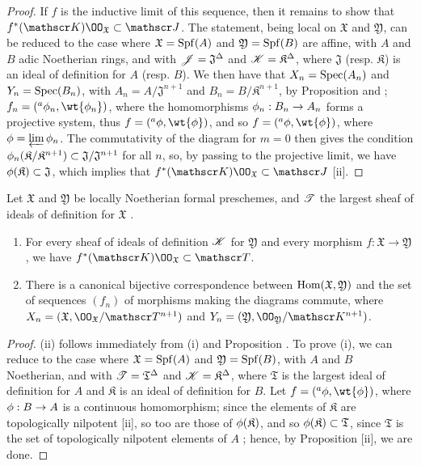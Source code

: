 \begin{proof}
\label{proof-1.10.6.9}
If $f$ is the inductive limit of this sequence, then it remains to show that $f^*(\sh{K})\OO_\mathfrak{X}\subset\sh{J}$.
The statement, being local on $\mathfrak{X}$ and $\mathfrak{Y}$, can be reduced to the case where $\mathfrak{X}=\operatorname{Spf}(A)$ and $\mathfrak{Y}=\operatorname{Spf}(B)$ are affine, with $A$ and $B$ adic Noetherian rings, and with $\mathscr{J}=\mathfrak{J}^\Delta$ and $\mathscr{K}=\mathfrak{K}^\Delta$, where $\mathfrak{J}$ (resp. $\mathfrak{K}$) is an ideal of definition for $A$ (resp. $B$).
We then have that $X_n=\operatorname{Spec}(A_n)$ and $Y_n=\operatorname{Spec}(B_n)$, with $A_n=A/\mathfrak{J}^{n+1}$ and $B_n=B/\mathfrak{K}^{n+1}$, by Proposition  and ; $f_n=({}^a\vphi_n,\wt{\vphi_n})$, where the homomorphisms $\vphi_n:B_n\to A_n$ forms a projective system, thus $f=({}^a\vphi,\wt{\vphi})$, and so $f=({}^a\vphi,\wt{\vphi})$, where $\phi=\varprojlim\phi_n$.
The commutativity of the diagram  for $m=0$ then gives the condition $\phi_n(\mathfrak{K}/\mathfrak{K}^{n+1})\subset\mathfrak{J}/\mathfrak{J}^{n+1}$ for all $n$, so, by passing to the projective limit, we have $\phi(\mathfrak{K})\subset\mathfrak{J}$, which implies that $f^*(\sh{K})\OO_\mathfrak{X}\subset\sh{J}$ [ii].
\end{proof}

\begin{cor}[10.6.10]
\label{1.10.6.10}
Let $\mathfrak{X}$ and $\mathfrak{Y}$ be locally Noetherian formal preschemes, and $\mathscr{T}$ the largest sheaf of ideals of definition for $\mathfrak{X}$ .
\begin{enumerate}[label=\emph{(\roman*)}]
  \item For every sheaf of ideals of definition $\mathscr{K}$ for $\mathfrak{Y}$ and every morphism $f:\mathfrak{X}\to\mathfrak{Y}$, we have $f^*(\sh{K})\OO_\mathfrak{X}\subset\sh{T}$.
  \item There is a canonical bijective correspondence between $\operatorname{Hom}(\mathfrak{X},\mathfrak{Y})$ and the set of sequences $(f_n)$ of morphisms making the diagrams  commute, where $X_n=(\mathfrak{X},\OO_\mathfrak{X}/\sh{T}^{n+1})$ and $Y_n=(\mathfrak{Y},\OO_\mathfrak{Y}/\sh{K}^{n+1})$.
\end{enumerate}
\end{cor}

\begin{proof}
\label{proof-1.10.6.10}
(ii) follows immediately from (i) and Proposition .
To prove (i), we can reduce to the case where $\mathfrak{X}=\operatorname{Spf}(A)$ and $\mathfrak{Y}=\operatorname{Spf}(B)$, with $A$ and $B$ Noetherian, and with $\mathscr{T}=\mathfrak{T}^\Delta$ and $\mathscr{K}=\mathfrak{K}^\Delta$, where $\mathfrak{T}$ is the largest ideal of definition for $A$ and $\mathfrak{K}$ is an ideal of definition for $B$.
Let $f=({}^a\vphi,\wt{\vphi})$, where $\vphi:B\to A$ is a continuous homomorphism; since the elements of $\mathfrak{K}$ are topologically nilpotent [ii], so too are those of $\phi(\mathfrak{K})$, and so $\phi(\mathfrak{K})\subset\mathfrak{T}$, since $\mathfrak{T}$ is the set of topologically nilpotent elements of $A$ ; hence, by Proposition [ii], we are done.
\end{proof}

